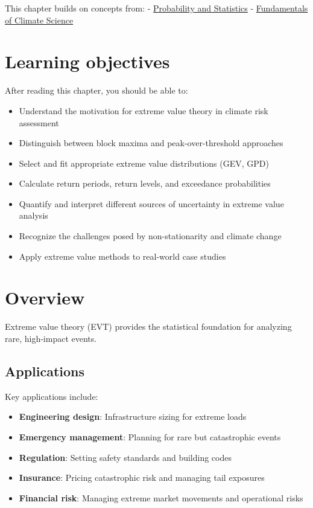 \documentclass[
  letterpaper,
  DIV=11,
  numbers=noendperiod]{scrreprt}
\providecommand{\tightlist}{%
  \setlength{\itemsep}{0pt}\setlength{\parskip}{0pt}}
\begin{document}

This chapter builds on concepts from: -
\href{./chapters/fundamentals/probability-stats.qmd}{Probability and
Statistics} -
\href{./chapters/fundamentals/climate-science.qmd}{Fundamentals of
Climate Science}

\section*{Learning objectives}\label{learning-objectives-7}


After reading this chapter, you should be able to:

\begin{itemize}
\tightlist
\item
  Understand the motivation for extreme value theory in climate risk
  assessment
\item
  Distinguish between block maxima and peak-over-threshold approaches\\
\item
  Select and fit appropriate extreme value distributions (GEV, GPD)
\item
  Calculate return periods, return levels, and exceedance probabilities
\item
  Quantify and interpret different sources of uncertainty in extreme
  value analysis
\item
  Recognize the challenges posed by non-stationarity and climate change
\item
  Apply extreme value methods to real-world case studies
\end{itemize}

\section{Overview}\label{overview-3}

Extreme value theory (EVT) provides the statistical foundation for
analyzing rare, high-impact events.

\subsection{Applications}\label{applications-1}

Key applications include:

\begin{itemize}
\tightlist
\item
  \textbf{Engineering design}: Infrastructure sizing for extreme loads
\item
  \textbf{Emergency management}: Planning for rare but catastrophic
  events\\
\item
  \textbf{Regulation}: Setting safety standards and building codes
\item
  \textbf{Insurance}: Pricing catastrophic risk and managing tail
  exposures
\item
  \textbf{Financial risk}: Managing extreme market movements and
  operational risks
\end{itemize}
\end{document}
